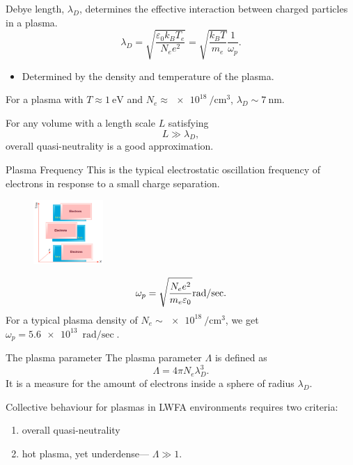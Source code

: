\documentclass[draft]{beamer}
\begin{document}
\begin{frame}{\debye}
  Debye length, $\lambda_D$, determines the effective interaction between charged particles in a plasma.
  \begin{equation*}
\lambda_D=\sqrt{\frac{\varepsilon_0 k_B T_e}{N_e e^2}}=\sqrt{\frac{k_B T}{m_e}}\frac{1}{\omega_p}.
\end{equation*}
\begin{itemize}
  \item Determined by the density and temperature of the plasma.
\end{itemize}
For a plasma with $T\approx \SI{1}{\eV}$ and $N_e\approx \SI{e18}{\per\cubic\cm}$, $\lambda_D\sim \SI{7}{\nm}$.

For any volume with a length scale $L$ satisfying 
\begin{equation*}
L \gg \lambda_D,
\label{eq:quasiNeutrality}
\end{equation*}
overall quasi-neutrality is a good approximation.
\end{frame}
\newcommand{\plasmafreq}{Plasma Frequency}
\begin{frame}{\plasmafreq}
This is the typical electrostatic oscillation frequency of electrons in response to a small charge separation.
\begin{figure}
  \includegraphics[width=100px]{figures/plasma_oscillation.PNG}
\end{figure}
\begin{equation*}
		\omega_p=\sqrt{\frac{N_e e^2}{m_e \varepsilon_0}}\si[per-mode=fraction]{\radian\per\sec}.\label{eq:plasma-frequency}
\end{equation*}
For a typical plasma density of $N_e \sim \SI{e18}{\per\cubic\cm}$, we get $\omega_p=\SI{5.6e13}{\radian\per\sec}$.%
\end{frame}
\begin{frame}{The plasma parameter}
The plasma parameter $\Lambda$ is defined as
\begin{equation*}
  \Lambda=4\pi N_e \lambda_D ^3.
\end{equation*}
It is a measure for the amount of electrons inside a sphere of radius $\lambda_D$.

Collective behaviour for plasmas in LWFA environments requires two criteria:
\begin{enumerate}
  \item overall quasi-neutrality
  \item hot plasma, yet underdense\footnotemark --- $\Lambda \gg 1$.
\end{enumerate}
\end{frame}
\end{document}
